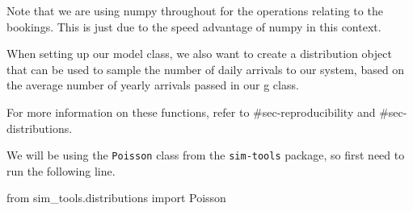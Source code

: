 \documentclass[
  letterpaper,
  DIV=11,
  numbers=noendperiod]{scrreprt}
\newenvironment{Shaded}{\begin{snugshade}}{\end{snugshade}}
\newcommand{\ImportTok}[1]{\textcolor[rgb]{0.00,0.46,0.62}{#1}}
\newcommand{\NormalTok}[1]{\textcolor[rgb]{0.00,0.23,0.31}{#1}}
\begin{document}
\begin{tcolorbox}[enhanced jigsaw, rightrule=.15mm, colback=white, colframe=quarto-callout-tip-color-frame, colbacktitle=quarto-callout-tip-color!10!white, toprule=.15mm, coltitle=black, opacityback=0, titlerule=0mm, bottomtitle=1mm, breakable, title=\textcolor{quarto-callout-tip-color}{\faLightbulb}\hspace{0.5em}{Tip}, opacitybacktitle=0.6, toptitle=1mm, arc=.35mm, bottomrule=.15mm, leftrule=.75mm, left=2mm]

Note that we are using numpy throughout for the operations relating to
the bookings. This is just due to the speed advantage of numpy in this
context.

\end{tcolorbox}

When setting up our model class, we also want to create a distribution
object that can be used to sample the number of daily arrivals to our
system, based on the average number of yearly arrivals passed in our g
class.

For more information on these functions, refer to \#sec-reproducibility
and \#sec-distributions.

We will be using the \texttt{Poisson} class from the \texttt{sim-tools}
package, so first need to run the following line.

\begin{Shaded}
\begin{Highlighting}[]
\ImportTok{from}\NormalTok{ sim\_tools.distributions }\ImportTok{import}\NormalTok{ Poisson}
\end{Highlighting}
\end{Shaded}
\end{document}
